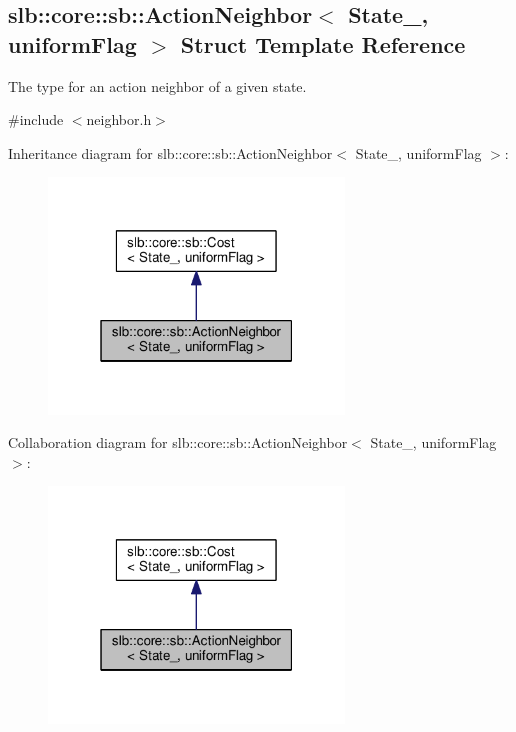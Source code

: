 \hypertarget{structslb_1_1core_1_1sb_1_1ActionNeighbor}{}\subsection{slb\+:\+:core\+:\+:sb\+:\+:Action\+Neighbor$<$ State\+\_\+, uniform\+Flag $>$ Struct Template Reference}
\label{structslb_1_1core_1_1sb_1_1ActionNeighbor}


The type for an action neighbor of a given state.  




{\ttfamily \#include $<$neighbor.\+h$>$}



Inheritance diagram for slb\+:\+:core\+:\+:sb\+:\+:Action\+Neighbor$<$ State\+\_\+, uniform\+Flag $>$\+:\nopagebreak
\begin{figure}[H]
\begin{center}
\leavevmode
\includegraphics[width=223pt]{structslb_1_1core_1_1sb_1_1ActionNeighbor__inherit__graph}
\end{center}
\end{figure}


Collaboration diagram for slb\+:\+:core\+:\+:sb\+:\+:Action\+Neighbor$<$ State\+\_\+, uniform\+Flag $>$\+:\nopagebreak
\begin{figure}[H]
\begin{center}
\leavevmode
\includegraphics[width=223pt]{structslb_1_1core_1_1sb_1_1ActionNeighbor__coll__graph}
\end{center}
\end{figure}
